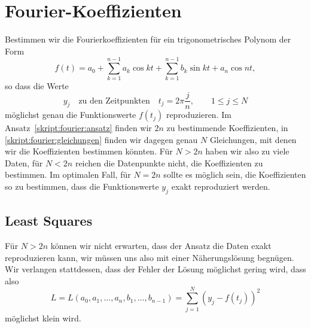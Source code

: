 %
%
%
\section{Fourier-Koeffizienten}
Bestimmen wir die Fourierkoeffizienten für ein trigonometrisches Polynom
der Form
\begin{equation}
f(t)
=
a_0 + \sum_{k=1}^{n-1} a_k\cos kt + \sum_{k=1}^{n-1} b_k\sin kt + a_n\cos nt,
\label{skript:fourier:ansatz}
\end{equation}
so dass die Werte
\begin{equation}
y_j \quad\text{zu den Zeitpunkten}\quad t_j=2\pi\frac{j}{n},\qquad 1\le j\le N
\label{skript:fourier:gleichungen}
\end{equation}
möglichst genau die Funktionswerte $f(t_j)$ reproduzieren.
Im Ansatz~\eqref{skript:fourier:ansatz} finden wir $2n$ zu bestimmende 
Koeffizienten, in \eqref{skript:fourier:gleichungen} finden wir dagegen
genau $N$ Gleichungen, mit denen wir die Koeffizienten bestimmen könnten.
Für $N>2n$ haben wir also zu viele Daten, für $N<2n$ reichen die Datenpunkte
nicht, die Koeffizienten zu bestimmen.
Im optimalen Fall, für $N=2n$ sollte es möglich sein, die Koeffizienten so
zu bestimmen, dass die Funktionswerte $y_j$ exakt reproduziert werden.

\subsection{Least Squares}
Für $N>2n$ können wir nicht erwarten, dass der Ansatz die Daten
exakt reproduzieren kann, wir müssen uns also mit einer
Näherungslösung begnügen.
Wir verlangen stattdessen, dass der Fehler der Lösung möglichst gering
wird, dass also
\[
L=L(a_0,a_1,\dots,a_n,b_1,\dots,b_{n-1})= \sum_{j=1}^N (y_j - f(t_j))^2
\]
möglichst klein wird.

